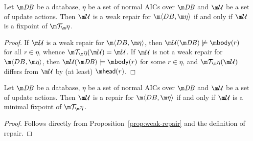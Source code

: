 \begin{proposition}
  \label{prop:weak-repair}
  Let $\db$ be a database, $\eta$ be a set of normal AICs over $\db$ and $\UU$ be a set of update actions.
  Then $\UU$ is a weak repair for $\fulldb$ if and only if $\UU$ is a fixpoint of $\Op$.
\end{proposition}
\begin{proof}
  If $\UU$ is a weak repair for $\fulldb$, then $\UU(\db)\not\models\body(r)$ for all $r\in\eta$, whence $\Op(\UU)=\UU$.
  If $\UU$ is not a weak repair for $\fulldb$, then $\UU(\db)\models\body(r)$ for some $r\in\eta$, and $\Op(\UU)$ differs from $\UU$ by (at least) $\head(r)$.
\end{proof}

\begin{proposition}
  \label{prop:repair}
  Let $\db$ be a database, $\eta$ be a set of normal AICs over $\db$ and $\UU$ be a set of update actions.
  Then $\UU$ is a repair for $\fulldb$ if and only if $\UU$ is a minimal fixpoint of $\Op$.
\end{proposition}
\begin{proof}
  Follows directly from Proposition~\ref{prop:weak-repair} and the definition of repair.
\end{proof}

